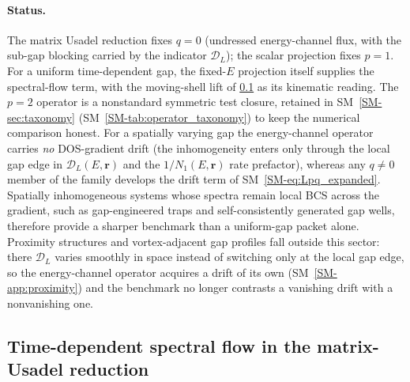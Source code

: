 \documentclass[
  aps,
  prb,
  preprint,
  superscriptaddress,
  longbibliography,
  nofootinbib
]{revtex4-2}
\newcommand{\br}{\mathbf{r}}
\newcommand{\DOS}{N_1}
\begin{document}
\paragraph{Status.} The matrix Usadel reduction fixes \(q=0\) (undressed
energy-channel flux, with the sub-gap blocking carried by the indicator
\(\mathcal{D}_L\)); the scalar projection fixes \(p=1\). For a uniform
time-dependent gap, the fixed-\(E\) projection itself supplies the
spectral-flow term, with the moving-shell lift of
\cref{sec:tdep_spectral_flow} as its kinematic reading. The \(p=2\)
operator is a nonstandard symmetric test closure, retained in
SM~\cref{SM-sec:taxonomy} (SM~\cref{SM-tab:operator_taxonomy}) to keep the numerical
comparison honest. For a spatially varying gap the energy-channel
operator carries \emph{no} DOS-gradient drift (the inhomogeneity enters
only through the local gap edge in \(\mathcal{D}_L(E,\br)\) and the
\(1/\DOS(E,\br)\) rate prefactor), whereas any \(q\neq0\) member of the
family develops the drift term of SM~\cref{SM-eq:Lpq_expanded}. Spatially
inhomogeneous systems whose spectra remain local BCS across the gradient,
such as gap-engineered traps and self-consistently generated gap wells,
therefore provide a sharper benchmark than a uniform-gap packet alone.
Proximity structures and vortex-adjacent gap profiles fall outside this
sector: there \(\mathcal{D}_L\) varies smoothly in space instead of
switching only at the local gap edge, so the energy-channel operator
acquires a drift of its own (SM~\cref{SM-app:proximity}) and the
benchmark no longer contrasts a vanishing drift with a nonvanishing one.

\subsection{Time-dependent spectral flow in the matrix-Usadel reduction}
\label{sec:tdep_spectral_flow}
\end{document}
